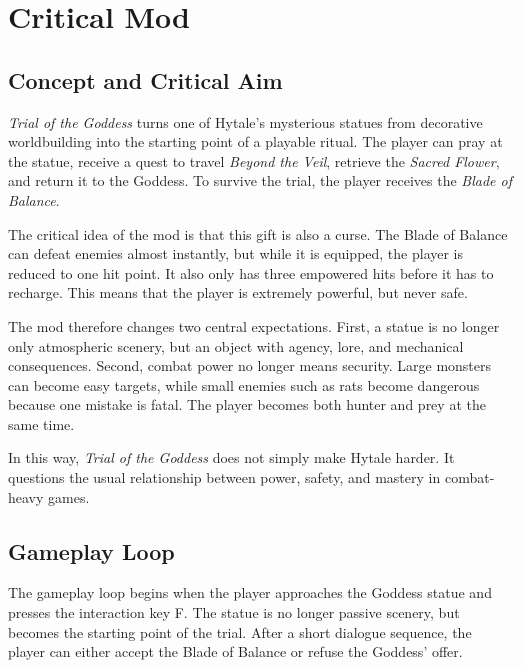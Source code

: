 \section{Critical Mod}

\subsection{Concept and Critical Aim}

\textit{Trial of the Goddess} turns one of Hytale's mysterious statues
from decorative worldbuilding into the starting point of a playable ritual.
The player can pray at the statue,
receive a quest to travel \textit{Beyond the Veil},
retrieve the \textit{Sacred Flower},
and return it to the Goddess.
To survive the trial,
the player receives the \textit{Blade of Balance}.

The critical idea of the mod is that this gift is also a curse.
The Blade of Balance can defeat enemies almost instantly,
but while it is equipped,
the player is reduced to one hit point.
It also only has three empowered hits before it has to recharge.
This means that the player is extremely powerful,
but never safe.

The mod therefore changes two central expectations.
First,
a statue is no longer only atmospheric scenery,
but an object with agency,
lore,
and mechanical consequences.
Second,
combat power no longer means security.
Large monsters can become easy targets,
while small enemies such as rats become dangerous because one mistake is fatal.
The player becomes both hunter and prey at the same time.

In this way,
\textit{Trial of the Goddess} does not simply make Hytale harder.
It questions the usual relationship between power,
safety,
and mastery in combat-heavy games.


\subsection{Gameplay Loop}

The gameplay loop begins when the player approaches the Goddess statue
and presses the interaction key F.
The statue is no longer passive scenery,
but becomes the starting point of the trial.
After a short dialogue sequence,
the player can either accept the Blade of Balance
or refuse the Goddess' offer.

